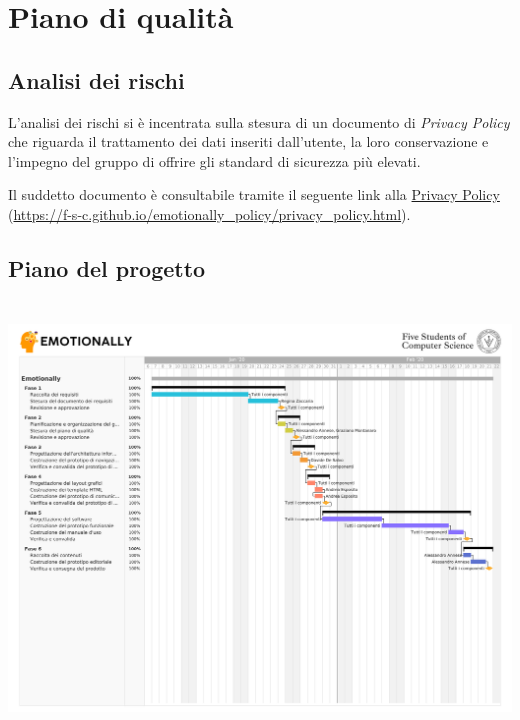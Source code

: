 
\chapter{Piano di qualità}\label{chap:piano-qualita}

\section{Analisi dei rischi}\label{sec:analisi-rischi}
L'analisi dei rischi si è incentrata sulla stesura di un documento di 
\textit{Privacy Policy} che riguarda il trattamento dei dati inseriti 
dall'utente, la loro conservazione e l'impegno del gruppo di offrire gli 
standard di sicurezza più elevati. 

Il suddetto documento è consultabile tramite il seguente link alla 
\href{https://f-s-c.github.io/emotionally_policy/privacy_policy.html}{Privacy 
Policy} (\url{https://f-s-c.github.io/emotionally_policy/privacy_policy.html}).

\section{Piano del progetto}\label{sec:piano-progetto}
\includegraphics[height=11.5cm, frame]{images/gantt.png}

